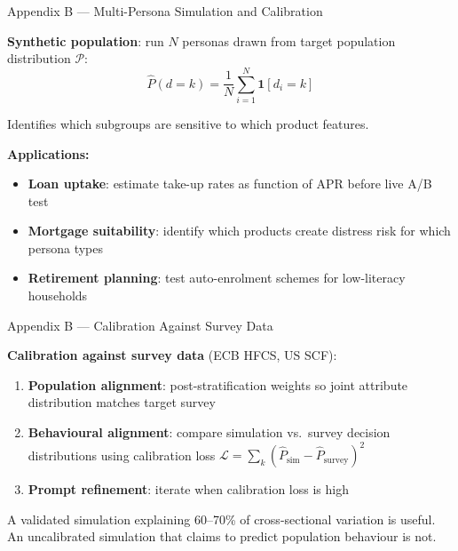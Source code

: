 \documentclass[9pt,t]{beamer}
\begin{document}
\begin{frame}[noframenumbering]{Appendix B --- Multi-Persona Simulation and Calibration}

\textbf{Synthetic population}: run $N$ personas drawn from target population distribution $\mathcal{P}$:
\[
  \hat{P}(d = k) = \frac{1}{N} \sum_{i=1}^{N} \mathbf{1}[d_i = k]
\]

Identifies which subgroups are sensitive to which product features.

\medskip
\textbf{Applications:}
\begin{itemize}
  \item \textbf{Loan uptake}: estimate take-up rates as function of APR before live A/B test
  \item \textbf{Mortgage suitability}: identify which products create distress risk for which persona types
  \item \textbf{Retirement planning}: test auto-enrolment schemes for low-literacy households
\end{itemize}
\end{frame}

\begin{frame}[noframenumbering]{Appendix B --- Calibration Against Survey Data}

\textbf{Calibration against survey data} (ECB HFCS, US SCF):
\begin{enumerate}
  \item \textbf{Population alignment}: post-stratification weights so joint attribute distribution matches target survey
  \item \textbf{Behavioural alignment}: compare simulation vs.\ survey decision distributions using calibration loss $\mathcal{L} = \sum_k (\hat{P}_{\text{sim}} - \hat{P}_{\text{survey}})^2$
  \item \textbf{Prompt refinement}: iterate when calibration loss is high
\end{enumerate}

\medskip
A validated simulation explaining 60--70\% of cross-sectional variation is useful.
An uncalibrated simulation that claims to predict population behaviour is not.
\end{frame}
\end{document}
